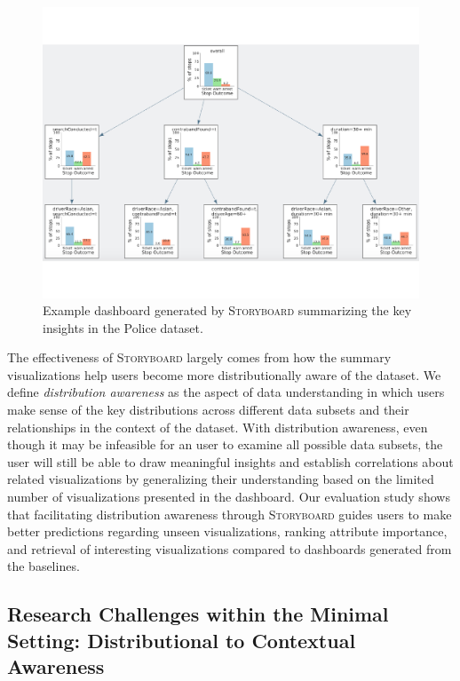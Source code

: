 \documentclass[11pt]{article}
\newcommand{\sbd}{\textsc{Storyboard}\xspace}
\begin{document}
\begin{figure}
\centering
\vspace{-10pt}
\includegraphics[width=\linewidth]{figs/storyboard.pdf}
\caption{Example dashboard generated by \sbd summarizing the key insights in the Police dataset.}
\label{fig:sbd}
\vspace{-10pt}
\end{figure} 

\par The effectiveness of \sbd largely 
comes from how the summary visualizations 
help users become more distributionally aware of the dataset. 
We define \emph{distribution awareness} 
as the aspect of data understanding in which users make sense of the key distributions across different data subsets and their relationships in the context of the dataset. With distribution awareness, 
even though it may be infeasible for an 
user to examine all possible data subsets, 
the user will still be able to draw meaningful 
insights and establish correlations 
about related visualizations by 
generalizing their understanding based 
on the limited number of visualizations
 presented in the dashboard. 
 Our evaluation study shows that facilitating 
 distribution awareness through \sbd 
 guides users to make better predictions 
 regarding unseen visualizations, 
 ranking attribute importance, and 
 retrieval of interesting visualizations 
 compared to dashboards generated from the baselines. 

\subsection{Research Challenges within the Minimal Setting: Distributional to Contextual Awareness}
\end{document}
